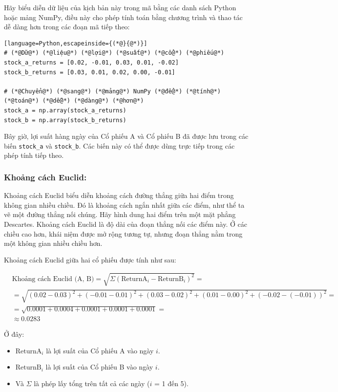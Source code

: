 Hãy biểu diễn dữ liệu của kịch bản này trong mã bằng các danh sách Python hoặc mảng NumPy, điều này cho phép tính toán bằng chương trình và thao tác dễ dàng hơn trong các đoạn mã tiếp theo:

\begin{lstlisting}[language=Python,escapeinside={(*@}{@*)}]
# (*@Dữ@*) (*@liệu@*) (*@lợi@*) (*@suất@*) (*@cổ@*) (*@phiếu@*)
stock_a_returns = [0.02, -0.01, 0.03, 0.01, -0.02]
stock_b_returns = [0.03, 0.01, 0.02, 0.00, -0.01]

# (*@Chuyển@*) (*@sang@*) (*@mảng@*) NumPy (*@để@*) (*@tính@*) (*@toán@*) (*@dễ@*) (*@dàng@*) (*@hơn@*)
stock_a = np.array(stock_a_returns)
stock_b = np.array(stock_b_returns)
\end{lstlisting}

Bây giờ, lợi suất hàng ngày của Cổ phiếu A và Cổ phiếu B đã được lưu trong các biến \texttt{stock\_a} và \texttt{stock\_b}. Các biến này có thể được dùng trực tiếp trong các phép tính tiếp theo.

\subsubsection*{Khoảng cách Euclid:}

Khoảng cách Euclid biểu diễn khoảng cách đường thẳng giữa hai điểm trong không gian nhiều chiều. Đó là khoảng cách ngắn nhất giữa các điểm, như thể ta vẽ một đường thẳng nối chúng. Hãy hình dung hai điểm trên một mặt phẳng Descartes. Khoảng cách Euclid là độ dài của đoạn thẳng nối các điểm này. Ở các chiều cao hơn, khái niệm được mở rộng tương tự, nhưng đoạn thẳng nằm trong một không gian nhiều chiều hơn.

Khoảng cách Euclid giữa hai cổ phiếu được tính như sau:

\begin{align*}
    & \text{Khoảng cách Euclid (A, B)} = \sqrt{ \Sigma (\text{ReturnA}_i - \text{ReturnB}_i)^2} = \\
    & = \sqrt{(0.02 - 0.03)^2 + (-0.01 - 0.01)^2 + (0.03 - 0.02)^2 + (0.01 - 0.00)^2 + (-0.02 - (-0.01))^2} = \\
    & = \sqrt{0.0001 + 0.0004 + 0.0001 + 0.0001 + 0.0001} = \\
    & \approx 0.0283
\end{align*}

Ở đây:

\begin{itemize}
  \item $\text{ReturnA}_i$ là lợi suất của Cổ phiếu A vào ngày $i$.
  \item $\text{ReturnB}_i$ là lợi suất của Cổ phiếu B vào ngày $i$.
  \item Và $\Sigma$ là phép lấy tổng trên tất cả các ngày ($i$ = 1 đến 5).
\end{itemize}

